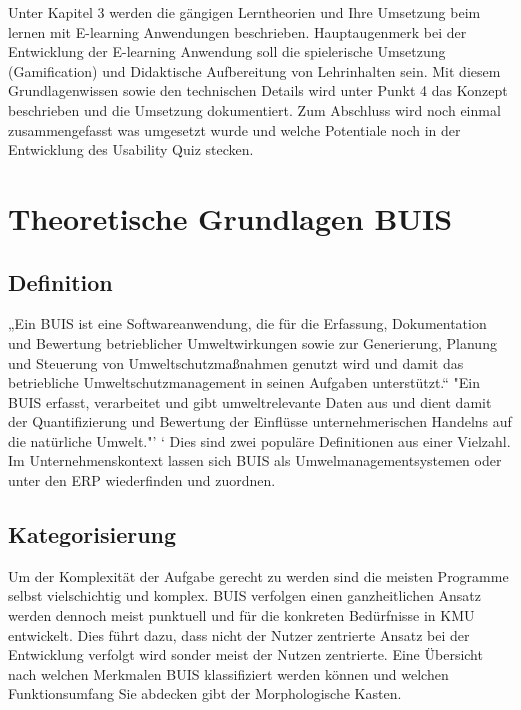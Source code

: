 \documentclass[a4paper, 12pt, twoside, BCOR=20mm, DIV=calc, abstracton, parskip=half*, toc=bibliography, toc=listof, headsepline, footsepline, headings=small, numbers=enddot]{scrreprt}
\begin{document}
Unter Kapitel 3 werden die gängigen Lerntheorien und Ihre Umsetzung beim lernen mit E-learning Anwendungen beschrieben. Hauptaugenmerk bei der Entwicklung der E-learning Anwendung soll die spielerische Umsetzung (Gamification) und Didaktische Aufbereitung von Lehrinhalten sein. 
Mit diesem Grundlagenwissen sowie den technischen Details wird unter Punkt 4 das Konzept beschrieben und die Umsetzung dokumentiert. Zum Abschluss wird noch einmal zusammengefasst was umgesetzt wurde und welche Potentiale noch in der Entwicklung des Usability Quiz stecken. 

\chapter{Theoretische Grundlagen BUIS}
\section{Definition}
„Ein \ac{BUIS} %
 ist eine Softwareanwendung, die für die Erfassung, Dokumentation und Bewertung betrieblicher Umweltwirkungen sowie  zur Generierung, Planung und Steuerung von Umweltschutzmaßnahmen genutzt wird und damit das betriebliche Umweltschutzmanagement in seinen Aufgaben unterstützt.“ \cite{wohlgemuth2008konzepte}
 "Ein BUIS erfasst, verarbeitet und gibt umweltrelevante Daten aus und dient damit der Quantifizierung und Bewertung der Einflüsse unternehmerischen Handelns auf die natürliche Umwelt."'\cite{Wiki_BUIS} `
Dies sind zwei populäre Definitionen aus einer Vielzahl. Im Unternehmenskontext lassen sich \ac{BUIS} als Umwelmanagementsystemen  oder unter den \acs{ERP} wiederfinden und zuordnen.  

\section{Kategorisierung}
 Um der Komplexität der Aufgabe gerecht zu werden sind die meisten Programme selbst vielschichtig und komplex. \ac{BUIS} verfolgen einen ganzheitlichen Ansatz werden dennoch meist punktuell und für die konkreten Bedürfnisse in \ac{KMU} entwickelt. Dies führt dazu, dass nicht der Nutzer zentrierte Ansatz bei der Entwicklung verfolgt wird sonder meist der Nutzen zentrierte.  
Eine Übersicht nach welchen Merkmalen \ac{BUIS} klassifiziert werden können und welchen Funktionsumfang Sie abdecken gibt der Morphologische Kasten.
\end{document}
